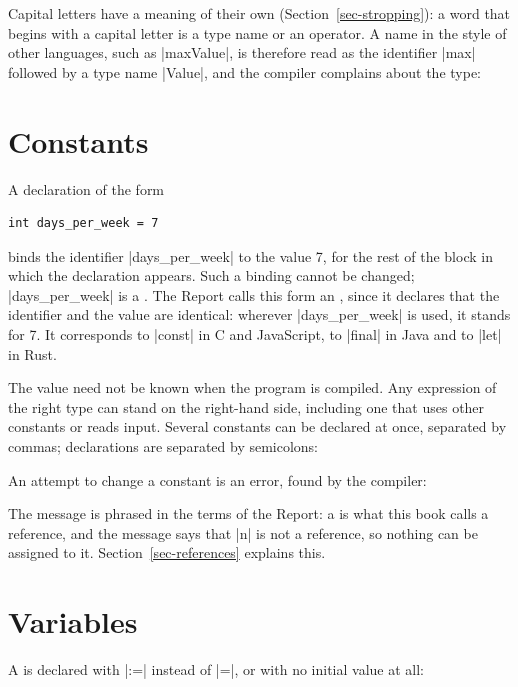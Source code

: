 Capital letters have a meaning of their own (Section~\ref{sec-stropping}): a word that
begins with a capital letter is a type name or an operator. A name in the
style of other languages, such as \code|maxValue|, is therefore read as
the identifier \code|max| followed by a type name \code|Value|, and the
compiler complains about the type:


\section{Constants}\label{sec-constants}

A declaration of the form
\begin{lstlisting}
int days_per_week = 7
\end{lstlisting}
binds the identifier \code|days_per_week| to the value 7, for the rest of
the block in which the declaration appears. Such a binding cannot be
changed; \code|days_per_week| is a . The Report calls this
form an , since it declares that the identifier
and the value are identical: wherever \code|days_per_week| is used, it
stands for 7. It corresponds to \code|const| in C and JavaScript, to
\code|final| in Java and to \code|let| in Rust.

The value need not be known when the program is compiled. Any expression
of the right type can stand on the right-hand side, including one that
uses other constants or reads input. Several constants can be declared
at once, separated by commas; declarations are separated by semicolons:


An attempt to change a constant is an error, found by the compiler:


The message is phrased in the terms of the Report: a  is what
this book calls a reference, and the message says that \code|n| is not a
reference, so nothing can be assigned to it. Section~\ref{sec-references}
explains this.

\section{Variables}\label{sec-variables}

A  is declared with \code|:=| instead of \code|=|, or with
no initial value at all:

